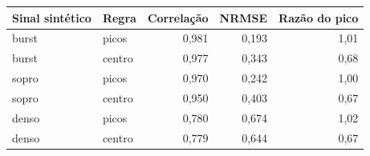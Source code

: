 \begin{tabular}{llrrr}
\toprule
\textbf{Sinal sintético} & \textbf{Regra} & \textbf{Correlação} & \textbf{NRMSE} & \textbf{Razão do pico} \\
\midrule
burst & picos & 0{,}981 & 0{,}193 & 1{,}01 \\
burst & centro & 0{,}977 & 0{,}343 & 0{,}68 \\
sopro & picos & 0{,}970 & 0{,}242 & 1{,}00 \\
sopro & centro & 0{,}950 & 0{,}403 & 0{,}67 \\
denso & picos & 0{,}780 & 0{,}674 & 1{,}02 \\
denso & centro & 0{,}779 & 0{,}644 & 0{,}67 \\
\bottomrule
\end{tabular}
